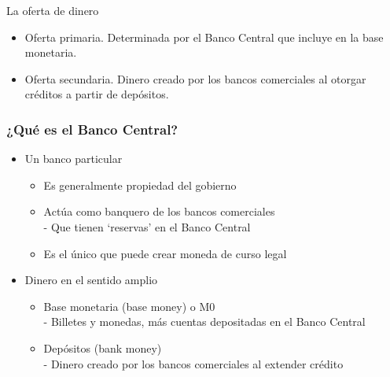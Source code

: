 \documentclass{beamer}
\begin{document}
\begin{frame}{La oferta de dinero}
    \begin{itemize}
       \item Oferta primaria. Determinada por el Banco Central que incluye en la base monetaria.
       \item Oferta secundaria. Dinero creado por los bancos comerciales al otorgar créditos a partir de depósitos.
       \end{itemize}
\end{frame}

\begin{frame}
\frametitle{¿Qué es el Banco Central?}
\begin{itemize}
    \item Un banco particular
        \begin{itemize}
            \item Es generalmente propiedad del gobierno
            \item Actúa como banquero de los bancos comerciales \\
            - Que tienen `reservas' en el Banco Central
            \item Es el único que puede crear moneda de curso legal
        \end{itemize}
    \item Dinero en el sentido amplio
        \begin{itemize}
            \item Base monetaria (base money) o M0 \\
            - Billetes y monedas, más cuentas depositadas en el Banco Central
            \item Depósitos (bank money) \\
            - Dinero creado por los bancos comerciales al extender crédito
        \end{itemize}
\end{itemize}
\end{frame}
\end{document}
